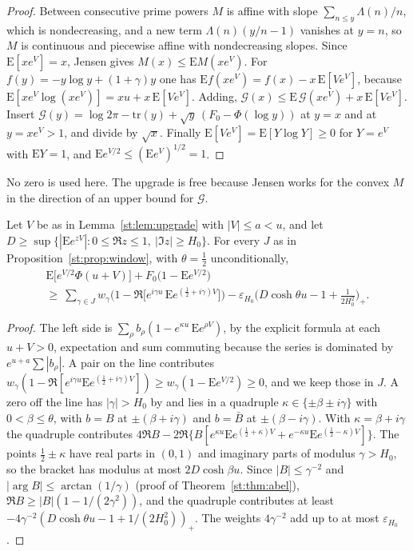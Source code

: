 \begin{proof}
Between consecutive prime powers $M$ is affine with slope $\sum_{n\le y}\Lambda(n)/n$, which is nondecreasing, and a new term $\Lambda(n)(y/n-1)$ vanishes at $y=n$, so $M$ is continuous and piecewise affine with nondecreasing slopes. Since $\mathrm E[xe^V]=x$, Jensen gives $M(x)\le\mathrm EM(xe^V)$. For $f(y)=-y\log y+(1+\gamma)y$ one has $\mathrm Ef(xe^V)=f(x)-x\,\mathrm E[Ve^V]$, because $\mathrm E[xe^V\log(xe^V)]=xu+x\,\mathrm E[Ve^V]$. Adding, $\mathcal G(x)\le\mathrm E\,\mathcal G(xe^V)+x\,\mathrm E[Ve^V]$. Insert $\mathcal G(y)=\log2\pi-\mathrm{tr}(y)+\sqrt y\,(F_0-\Phi(\log y))$ at $y=x$ and at $y=xe^V>1$, and divide by $\sqrt x$. Finally $\mathrm E[Ve^V]=\mathrm E[Y\log Y]\ge0$ for $Y=e^V$ with $\mathrm EY=1$, and $\mathrm Ee^{V/2}\le(\mathrm Ee^V)^{1/2}=1$.
\end{proof}
No zero is used here. The upgrade is free because Jensen works for the convex $M$ in the direction of an upper bound for $\mathcal G$.
\begin{lemma}\label{st:lem:hide}
Let $V$ be as in Lemma~\ref{st:lem:upgrade} with $|V|\le a<u$, and let $D\ge\sup\{|\mathrm Ee^{zV}|:0\le\Re z\le1,\ |\Im z|\ge H_0\}$. For every $J$ as in Proposition~\ref{st:prop:window}, with $\theta=\tfrac12$ unconditionally,
\begin{multline*}
\mathrm E\big[e^{V/2}\Phi(u+V)\big]+F_0\big(1-\mathrm Ee^{V/2}\big)\\\ge\ \sum_{\gamma\in J}w_\gamma\Big(1-\Re\big[e^{i\gamma u}\,\mathrm Ee^{(\frac12+i\gamma)V}\big]\Big)-\varepsilon_{H_0}\Big(D\cosh\theta u-1+\frac1{2H_0^2}\Big)_+ .
\end{multline*}
\end{lemma}
\begin{proof}
The left side is $\sum_\rho b_\rho(1-e^{\kappa u}\,\mathrm Ee^{\rho V})$, by the explicit formula at each $u+V>0$, expectation and sum commuting because the series is dominated by $e^{u+a}\sum|b_\rho|$. A pair on the line contributes $w_\gamma(1-\Re[e^{i\gamma u}\mathrm Ee^{(\frac12+i\gamma)V}])\ge w_\gamma(1-\mathrm Ee^{V/2})\ge0$, and we keep those in $J$. A zero off the line has $|\gamma|>H_0$ by \cite{PT21} and lies in a quadruple $\kappa\in\{\pm\beta\pm i\gamma\}$ with $0<\beta\le\theta$, with $b=B$ at $\pm(\beta+i\gamma)$ and $b=\bar B$ at $\pm(\beta-i\gamma)$. With $\kappa=\beta+i\gamma$ the quadruple contributes $4\Re B-2\Re\{B[e^{\kappa u}\mathrm Ee^{(\frac12+\kappa)V}+e^{-\kappa u}\mathrm Ee^{(\frac12-\kappa)V}]\}$. The points $\tfrac12\pm\kappa$ have real parts in $(0,1)$ and imaginary parts of modulus $\gamma>H_0$, so the bracket has modulus at most $2D\cosh\beta u$. Since $|B|\le\gamma^{-2}$ and $|\arg B|\le\arctan(1/\gamma)$ (proof of Theorem~\ref{st:thm:abel}), $\Re B\ge|B|(1-1/(2\gamma^2))$, and the quadruple contributes at least $-4\gamma^{-2}(D\cosh\theta u-1+1/(2H_0^2))_+$. The weights $4\gamma^{-2}$ add up to at most $\varepsilon_{H_0}$.
\end{proof}
